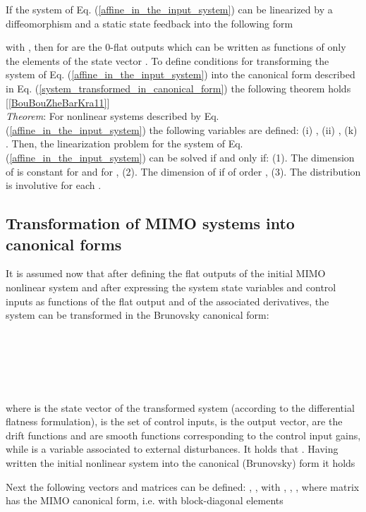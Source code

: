 \documentclass[journal]{IEEEtran}
\begin{document}
\noindent If the system of Eq. (\ref{affine_in_the_input_system}) can be linearized by a diffeomorphism  and a static state feedback  into the following form



\noindent with , then  for  are the 0-flat outputs which can be written as functions of only the elements of the state vector . To define conditions for transforming the system of Eq. (\ref{affine_in_the_input_system}) into the canonical form described in Eq. (\ref{system_transformed_in_canonical_form}) the following theorem holds [\ref{BouBouZheBarKra11}] \\

\noindent \textit{Theorem}: For nonlinear systems described by Eq. (\ref{affine_in_the_input_system}) the following variables are defined: (i) , (ii) , 
(k) .
Then, the linearization problem for the system of Eq. (\ref{affine_in_the_input_system})
can be solved if and only if: (1). The dimension of  is constant for  and for , (2). The dimension of  if of order , (3). The distribution  is involutive for each .

\subsection{Transformation of MIMO systems into canonical forms} \label{subsection 3.4: transformation into the Brunovksy form}

\noindent It is assumed now that after defining the flat outputs of the initial MIMO nonlinear system and after expressing the system state variables and control inputs as functions of the flat output and of the associated derivatives, the system can be transformed in the Brunovsky canonical form:

 \\
 \\
 \\
 \\
\\


\noindent where  is the state vector of the transformed system (according to the differential flatness formulation),  is the set of control inputs,  is the output vector,  are the drift functions and  are smooth functions corresponding to the control input gains, while  is a variable associated to external disturbances. It holds that . Having written the initial nonlinear system into the canonical (Brunovsky) form it holds



\noindent Next the following vectors and matrices can be defined:
, , with  , , , where matrix  has the MIMO canonical form, i.e. with block-diagonal elements
\end{document}
